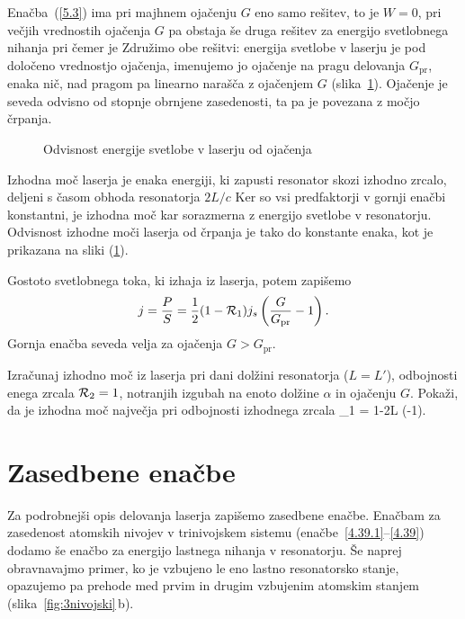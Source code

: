 Enačba~(\ref{5.3}) ima pri majhnem ojačenju $G$ eno samo rešitev, to je 
$W=0$, pri večjih vrednostih ojačenja $G$ pa obstaja še druga rešitev
za energijo svetlobnega nihanja
pri čemer je
Združimo obe rešitvi: energija svetlobe v laserju je pod določeno
vrednostjo ojačenja, imenujemo jo ojačenje na pragu delovanja $G_\mathrm{pr}$, enaka
nič, nad pragom pa linearno narašča z ojačenjem $G$ (slika~\ref{fig:energija}).
Ojačenje je seveda odvisno od stopnje obrnjene zasedenosti, ta pa je povezana
z močjo črpanja.
\begin{figure}[h]
\centering
\def\svgwidth{60truemm} 

\caption{Odvisnost energije svetlobe v laserju od ojačenja}
\label{fig:energija}
\end{figure}

Izhodna moč laserja je enaka energiji, ki zapusti
resonator skozi izhodno zrcalo, deljeni s časom obhoda resonatorja $2L/c$ 
Ker so vsi predfaktorji v gornji enačbi konstantni, je izhodna moč kar sorazmerna
z energijo svetlobe v resonatorju. Odvisnost izhodne moči laserja od črpanja je 
tako do konstante enaka, kot je prikazana na sliki (\ref{fig:energija}). 

Gostoto svetlobnega toka, ki izhaja iz laserja, potem zapišemo 
\begin{equation}
 j = \frac{P}{S} = \frac{1}{2} (1-{\cal {R}}_{1}) j_s \left(\frac{G}{G_\mathrm{pr}}-1\right).
\end{equation}
Gornja enačba seveda velja za ojačenja $G>G_\mathrm{pr}$.

\begin{definition}
Izračunaj izhodno moč iz laserja pri dani dolžini resonatorja ($L=L'$), 
odbojnosti enega zrcala ${\cal {R}}_{2}=1$, 
notranjih izgubah na enoto dolžine $\alpha$ in ojačenju $G$. Pokaži, da
je izhodna moč največja pri odbojnosti izhodnega zrcala 
\beq
{}_1 = 1-2\alpha L \left(-1\right).
\eeq
\end{definition}

\section{Zasedbene enačbe}
Za podrobnejši opis delovanja laserja zapišemo zasedbene enačbe. 
Enačbam za zasedenost atomskih nivojev 
v trinivojskem sistemu (enačbe~\ref{4.39.1}--\ref{4.39}) dodamo še enačbo za 
energijo lastnega nihanja v resonatorju. Še naprej obravnavajmo primer, ko je 
vzbujeno le eno lastno resonatorsko stanje, opazujemo pa prehode  med prvim 
in drugim vzbujenim atomskim stanjem (slika~\ref{fig:3nivojski}\,b). 

